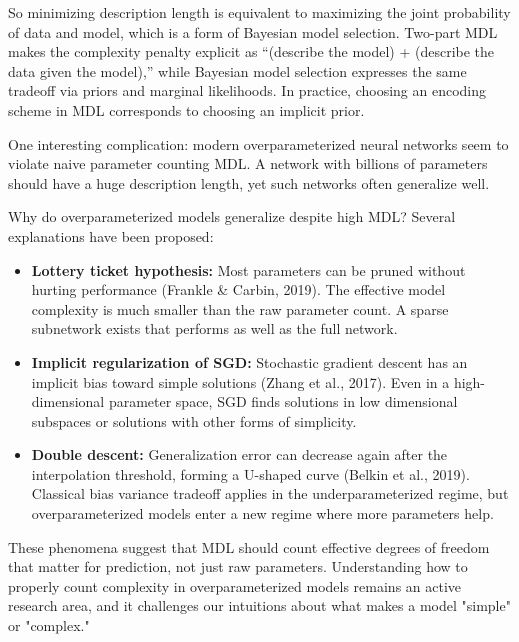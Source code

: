 So minimizing description length is equivalent to maximizing the joint probability of data and model, which is a form of Bayesian model selection. Two-part MDL makes the complexity penalty explicit as ``(describe the model) + (describe the data given the model),'' while Bayesian model selection expresses the same tradeoff via priors and marginal likelihoods. In practice, choosing an encoding scheme in MDL corresponds to choosing an implicit prior.

One interesting complication: modern overparameterized neural networks seem to violate naive parameter counting MDL. A network with billions of parameters should have a huge description length, yet such networks often generalize well.

Why do overparameterized models generalize despite high MDL? Several explanations have been proposed:

\begin{itemize}
\item \textbf{Lottery ticket hypothesis:} Most parameters can be pruned without hurting performance (Frankle \& Carbin, 2019). The effective model complexity is much smaller than the raw parameter count. A sparse subnetwork exists that performs as well as the full network.

\item \textbf{Implicit regularization of SGD:} Stochastic gradient descent has an implicit bias toward simple solutions (Zhang et al., 2017). Even in a high-dimensional parameter space, SGD finds solutions in low dimensional subspaces or solutions with other forms of simplicity.

\item \textbf{Double descent:} Generalization error can decrease again after the interpolation threshold, forming a U-shaped curve (Belkin et al., 2019). Classical bias variance tradeoff applies in the underparameterized regime, but overparameterized models enter a new regime where more parameters help.
\end{itemize}

These phenomena suggest that MDL should count effective degrees of freedom that matter for prediction, not just raw parameters. Understanding how to properly count complexity in overparameterized models remains an active research area, and it challenges our intuitions about what makes a model "simple" or "complex."

\vspace{2em}

